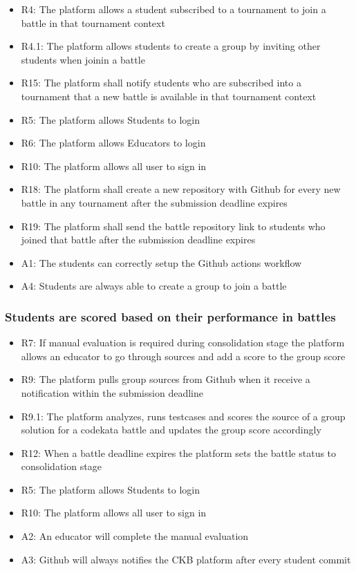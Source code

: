 \begin{itemize}
    \item R4: The platform allows a student subscribed to a tournament to join a battle in that tournament context
    \item R4.1: The platform allows students to create a group by inviting other students when joinin a battle
    \item R15: The platform shall notify students who are subscribed into a tournament that a new battle is available in that tournament context
    \item R5: The platform allows Students to login
    \item R6: The platform allows Educators to login
    \item R10: The platform allows all user to sign in
    \item R18: The platform shall create a new repository with Github for every new battle in any tournament after the submission deadline expires
    \item R19: The platform shall send the battle repository link to students who joined that battle after the submission deadline expires
    \item A1: The students can correctly setup the Github actions workflow
    \item A4: Students are always able to create a group to join a battle
\end{itemize}

\subsubsection{Students are scored based on their performance in battles}

\begin{itemize}
    \item R7: If manual evaluation is required during consolidation stage the platform allows an educator to go through sources and add a score to the group score
    \item R9: The platform pulls group sources from Github when it receive a notification within the submission deadline
    \item R9.1: The platform analyzes, runs testcases and scores the source of a group solution for a codekata battle and updates the group score accordingly
    \item R12: When a battle deadline expires the platform sets the battle status to consolidation stage
    \item R5: The platform allows Students to login
    \item R10: The platform allows all user to sign in

    \item A2: An educator will complete the manual evaluation
    \item A3: Github will always notifies the CKB platform after every student commit
\end{itemize}


